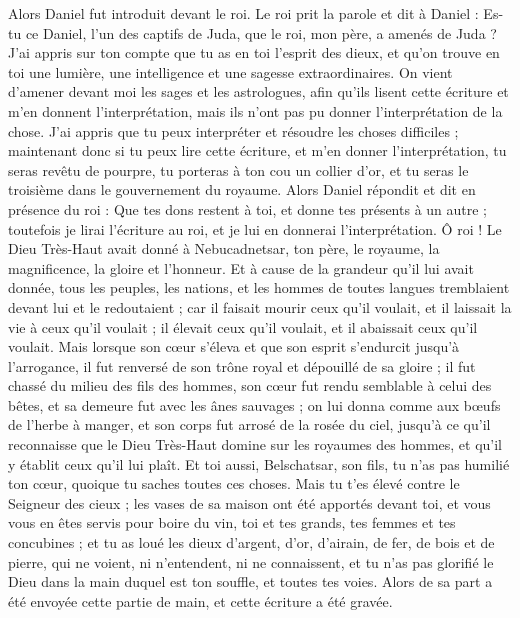 \begin{multicols}{2}
Alors Daniel fut introduit devant le roi. Le roi prit la parole et dit à Daniel : Es-tu ce Daniel, l'un des captifs de Juda, que le roi, mon père, a amenés de Juda ?
J'ai appris sur ton compte que tu as en toi l'esprit des dieux, et qu'on trouve en toi une lumière, une intelligence et une sagesse extraordinaires.
On vient d'amener devant moi les sages et les astrologues, afin qu'ils lisent cette écriture et m'en donnent l'interprétation, mais ils n'ont pas pu donner l'interprétation de la chose.
J'ai appris que tu peux interpréter et résoudre les choses difficiles ; maintenant donc si tu peux lire cette écriture, et m'en donner l'interprétation, tu seras revêtu de pourpre, tu porteras à ton cou un collier d'or, et tu seras le troisième dans le gouvernement du royaume.
Alors Daniel répondit et dit en présence du roi : Que tes dons restent à toi, et donne tes présents à un autre ; toutefois je lirai l'écriture au roi, et je lui en donnerai l'interprétation.
Ô roi ! Le Dieu Très-Haut avait donné à Nebucadnetsar, ton père, le royaume, la magnificence, la gloire et l'honneur.
Et à cause de la grandeur qu'il lui avait donnée, tous les peuples, les nations, et les hommes de toutes langues tremblaient devant lui et le redoutaient ; car il faisait mourir ceux qu'il voulait, et il laissait la vie à ceux qu'il voulait ; il élevait ceux qu'il voulait, et il abaissait ceux qu'il voulait.
Mais lorsque son cœur s'éleva et que son esprit s'endurcit jusqu'à l'arrogance, il fut renversé de son trône royal et dépouillé de sa gloire ;
il fut chassé du milieu des fils des hommes, son cœur fut rendu semblable à celui des bêtes, et sa demeure fut avec les ânes sauvages ; on lui donna comme aux bœufs de l'herbe à manger, et son corps fut arrosé de la rosée du ciel, jusqu'à ce qu'il reconnaisse que le Dieu Très-Haut domine sur les royaumes des hommes, et qu'il y établit ceux qu'il lui plaît.
Et toi aussi, Belschatsar, son fils, tu n'as pas humilié ton cœur, quoique tu saches toutes ces choses.
Mais tu t'es élevé contre le Seigneur des cieux ; les vases de sa maison ont été apportés devant toi, et vous vous en êtes servis pour boire du vin, toi et tes grands, tes femmes et tes concubines ; et tu as loué les dieux d'argent, d'or, d'airain, de fer, de bois et de pierre, qui ne voient, ni n'entendent, ni ne connaissent, et tu n'as pas glorifié le Dieu dans la main duquel est ton souffle, et toutes tes voies.
Alors de sa part a été envoyée cette partie de main, et cette écriture a été gravée.

\end{multicols}
